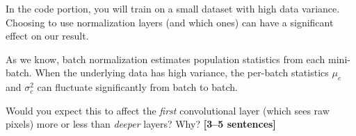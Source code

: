 \documentclass{csci1430}
\begin{document}
\begin{answer}[height=10]

\end{answer}

\begin{subquestion}[points=3]
In the code portion, you will train on a small dataset with high data variance. Choosing to use normalization layers (and which ones) can have a significant effect on our result.

As we know, batch normalization estimates population statistics from each mini-batch. When the underlying data has high variance, the per-batch statistics $\mu_c$ and $\sigma_c^2$ can fluctuate significantly from batch to batch. 

Would you expect this to affect the \emph{first} convolutional layer (which sees raw pixels) more or less than \emph{deeper} layers? Why? \textbf{[3--5 sentences]}
\end{subquestion}

\begin{answer}[height=12]

\end{answer}


\pagebreak

\writefeedback

\end{document}

